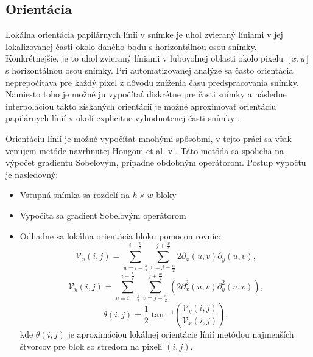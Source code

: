   \subsection{Orientácia} \label{sec:orientacia}
  Lokálna orientácia papilárnych línií v snímke je uhol zvieraný líniami v jej lokalizovanej časti okolo daného bodu
  s horizontálnou osou snímky. Konkrétnejšie, je to uhol zvieraný líniami v ľubovoľnej oblasti okolo pixelu $[x,y]$ s
  horizontálnou osou snímky. Pri automatizovanej analýze sa často orientácia neprepočítava pre každý pixel z dôvodu zníženia času predspracovania snímky.
  Namiesto toho je možné ju vypočítať diskrétne pre časti snímky a následne interpoláciou takto získaných orientácií je možné aproximovať
  orientáciu papilárnych línií v okolí explicitne vyhodnotenej časti snímky \cite{Handbook}.

  Orientáciu línií je možné vypočítať mnohými spôsobmi, v tejto práci sa však venujem metóde navrhnutej Hongom et al. v \cite{Hong}.
  Táto metóda sa spolieha na výpočet gradientu Sobelovým, prípadne obdobným operátorom. Postup výpočtu je nasledovný:
  \begin{itemize}
    \item Vstupná snímka sa rozdelí na $h \times w$ bloky
    \item Vypočíta sa gradient Sobelovým operátorom
    \item Odhadne sa lokálna orientácia bloku pomocou rovníc:
          \begin{equation}
            \mathcal{V}_x(i,j) = \sum_{u=i-\frac{h}{2}}^{i+\frac{h}{2}}\sum_{v=j-\frac{w}{2}}^{j+\frac{w}{2}} 2\partial _{x}(u,v) \partial _y(u,v),
          \end{equation}
          \begin{equation}
            \mathcal{V}_y(i,j) = \sum_{u=i-\frac{h}{2}}^{i+\frac{h}{2}}\sum_{v=j-\frac{w}{2}}^{j+\frac{w}{2}} (2\partial ^{2}_{x}(u,v) \partial ^{2}_{y}(u,v)),
          \end{equation}
          \begin{equation}
            \theta{}(i,j) = \frac{1}{2}\tan{}^{-1}(\frac{\mathcal{V}_y(i,j)}{\mathcal{V}_x(i,j)}),
          \end{equation}
          kde $\theta{}(i,j)$ je aproximáciou lokálnej orientácie línií metódou najmenších štvorcov pre blok so stredom na pixeli $(i,j)$.
  \end{itemize}


